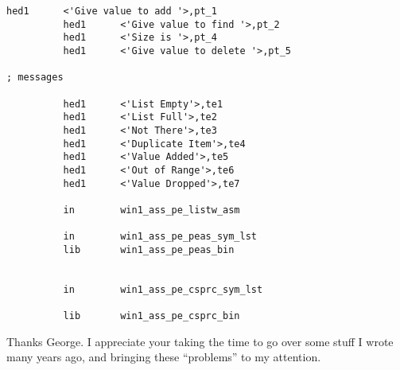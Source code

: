\begin{lstlisting}[firstnumber=1,caption={George's Linked List Example Program}]
          hed1      <'Give value to add '>,pt_1
          hed1      <'Give value to find '>,pt_2
          hed1      <'Size is '>,pt_4
          hed1      <'Give value to delete '>,pt_5

; messages

          hed1      <'List Empty'>,te1
          hed1      <'List Full'>,te2
          hed1      <'Not There'>,te3
          hed1      <'Duplicate Item'>,te4
          hed1      <'Value Added'>,te5
          hed1      <'Out of Range'>,te6
          hed1      <'Value Dropped'>,te7

          in        win1_ass_pe_listw_asm

          in        win1_ass_pe_peas_sym_lst
          lib       win1_ass_pe_peas_bin


          in        win1_ass_pe_csprc_sym_lst

          lib       win1_ass_pe_csprc_bin
\end{lstlisting}   

Thanks George. I appreciate your taking the time to go over some stuff I wrote many years ago, and bringing these ``problems'' to my attention.       